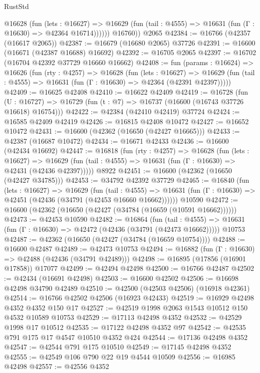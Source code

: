 \begin{lexlean}{RustStd}
\begin{coremodule}
            @16628
              (fun (lets : @16627) =>
              @16629 (fun (tail : @4555) => @16631 (fun (Γ : @16630) => @42364 @16714))))))
        @16760))
    @2065
@42384 := @16766 (@42357 (@16617 @2065))
@42387 := @16679 (@16680 @2065) @37726
@42391 := @16600 (@16671 (@42387 @16688) @16692)
@42392 := @16705 @2065
@42397 := @16702 (@16704 @42392 @37729 @16660 @16662)
@42408 := fun (params : @16624) =>
  @16626
    (fun (rty : @4257) =>
    @16628
      (fun (lets : @16627) =>
      @16629 (fun (tail : @4555) => @16631 (fun (Γ : @16630) => @42364 (@42391 @42397)))))
@42409 := @16625 @42408
@42410 := @16622 @42409
@42419 := @16728
    (fun (U : @16727) => @16729 (fun (t : @7) => @16737 (@16600 (@16743 @37726 @16618) @16754)))
@42422 := @42384 (@42410 @42419) @37724
@42424 := @16585 @42409 @42419
@42426 := @16815 @42408 @10472
@42427 := @16652 @10472
@42431 := @16600 (@42362 (@16650 (@42427 @16665)))
@42433 := @42387 (@16687 @10472)
@42434 := @16671 @42433
@42436 := @16600 (@42434 @16692)
@42447 := @16818
    (fun (rty : @4257) =>
    @16628
      (fun (lets : @16627) =>
      @16629 (fun (tail : @4555) => @16631 (fun (Γ : @16630) => @42431 (@42436 @42397)))))
    @8922
@42451 := @16600 (@42362 (@16650 (@42427 @34785)))
@42453 := @34792 @42392 @37729
@42465 := @16840
    (fun (lets : @16627) =>
    @16629
      (fun (tail : @4555) =>
      @16631 (fun (Γ : @16630) => @42451 (@42436 (@34791 (@42453 @16660 @16662))))))
    @10590
@42472 := @16600 (@42362 (@16650 (@42427 (@34784 (@16659 (@10591 @16662))))))
@42473 := @42453 @10590
@42482 := @16864
    (fun (tail : @4555) => @16631 (fun (Γ : @16630) => @42472 (@42436 (@34791 (@42473 @16662)))))
    @10753
@42487 := @42362 (@16650 (@42427 (@34784 (@16659 @10754))))
@42488 := @16600 @42487
@42489 := @42473 @10753
@42494 := @16882 (fun (Γ : @16630) => @42488 (@42436 (@34791 @42489)))
@42498 := @16895 (@17856 (@16901 @17858)) @17077
@42499 := @42494 @42498
@42500 := @16766 @42487
@42502 := @42434 (@16691 @42498)
@42503 := @16600 @42502
@42506 := @16698 @42498 @34790 @42489
@42510 := @42500 (@42503 @42506) (@16918 @42361)
@42514 := @16766 @42502 @42506 (@16923 @42433)
@42519 := @16929 @42498 @4352 @4352 @150 @17
@42527 := @42519 @1998 @2063 @1543 @10512 @150 @4532 @10589 @10753
@42529 := @17113 @42498 @4352
@42532 := @42529 @1998 @17 @10512
@42535 := @17122 @42498 @4352 @97
@42542 := @42535 @791 @175 @17 @4547 @10510 @4352 @424
@42544 := @17136 @42498 @4352
@42547 := @42544 @791 @175 @10510
@42549 := @17145 @42498 @4352
@42555 := @42549 @106 @790 @22 @19 @4544 @10509
@42556 := @16985 @42498
@42557 := @42556 @4352

\end{coremodule}
\end{lexlean}
